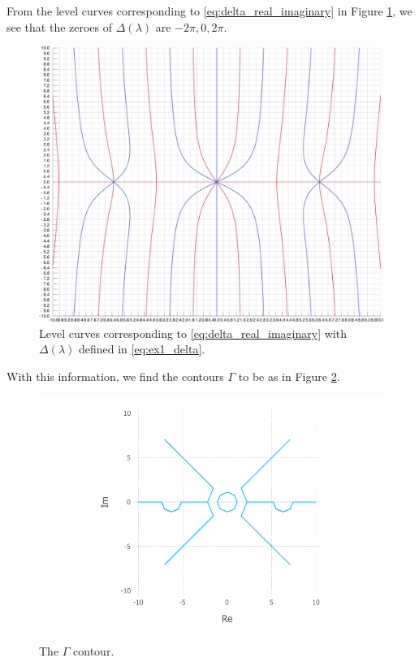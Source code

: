 \documentclass[11pt, oneside, a4paper]{article}
\begin{document}
From the level curves corresponding to \eqref{eq:delta_real_imaginary} in Figure \ref{fig:ex1_levelCurves}, we see that the zeroes of $\Delta(\lambda)$ are $-2\pi, 0, 2\pi$.
\begin{figure}[htpb!]
    \centering
    \includegraphics[width=1\linewidth]{ex1_levelCurves.pdf}
    \caption{Level curves corresponding to \eqref{eq:delta_real_imaginary} with $\Delta(\lambda)$ defined in \eqref{eq:ex1_delta}.}
    \label{fig:ex1_levelCurves}
\end{figure}
With this information, we find the contours $\Gamma$ to be as in Figure \ref{fig:ex1_contourPlot}.
\begin{figure}[htpb!]
    \centering
    \includegraphics[width=1\linewidth]{ex1_contourPlot.pdf}
    \caption{The $\Gamma$ contour.}
    \label{fig:ex1_contourPlot}
\end{figure}
\end{document}
